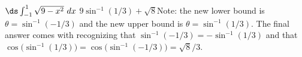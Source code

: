 {$\ds \int_{-1}^1 \sqrt{9-x^2}\ dx$
}
{$9\sin^{-1}(1/3)+\sqrt{8}$\quad Note: the new lower bound is $\theta=\sin^{-1}(-1/3)$ and the new upper bound is $\theta=\sin^{-1}(1/3)$. The final answer comes with recognizing that $\sin^{-1}(-1/3)=-\sin^{-1}(1/3)$ and that $\cos\big(\sin^{-1}(1/3)\big)=\cos\big(\sin^{-1}(-1/3)\big) = \sqrt{8}/3$.
}